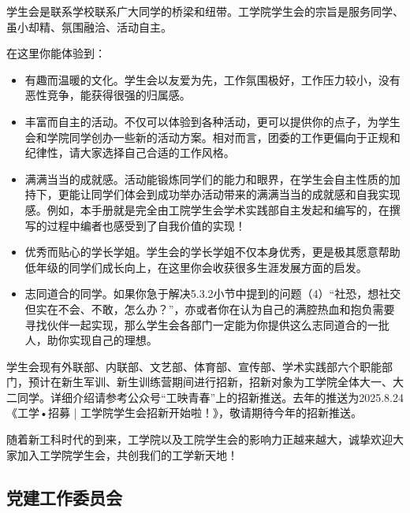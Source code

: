 学生会是联系学校联系广大同学的桥梁和纽带。工学院学生会的宗旨是服务同学、虽小却精、氛围融洽、活动自主。

\vspace{10pt}

在这里你能体验到：

\begin{itemize}
    \item 有趣而温暖的文化。学生会以友爱为先，工作氛围极好，工作压力较小，没有恶性竞争，能获得很强的归属感。
    
    \item 丰富而自主的活动。不仅可以体验到各种活动，更可以提供你的点子，为学生会和学院同学创办一些新的活动方案。相对而言，团委的工作更偏向于正规和纪律性，请大家选择自己合适的工作风格。
    
    \item 满满当当的成就感。活动能锻炼同学们的能力和眼界，在学生会自主性质的加持下，更能让同学们体会到成功举办活动带来的满满当当的成就感和自我实现感。例如，本手册就是完全由工院学生会学术实践部自主发起和编写的，在撰写的过程中编者也感受到了自我价值的实现！
    
    \item 优秀而贴心的学长学姐。学生会的学长学姐不仅本身优秀，更是极其愿意帮助低年级的同学们成长向上，在这里你会收获很多生涯发展方面的启发。
    
    \item 志同道合的同学。如果你急于解决5.3.2小节中提到的问题（4）“社恐，想社交但实在不会、不敢，怎么办？”，亦或者你在认为自己的满腔热血和抱负需要寻找伙伴一起实现，那么学生会各部门一定能为你提供这么志同道合的一批人，助你实现自己的理想。
\end{itemize}

\vspace{10pt}

学生会现有外联部、内联部、文艺部、体育部、宣传部、学术实践部六个职能部门，预计在新生军训、新生训练营期间进行招新，招新对象为工学院全体大一、大二同学。详细介绍请参考公众号“工映青春”上的招新推送。去年的推送为2025.8.24《工学•招募 | 工学院学生会招新开始啦！》，敬请期待今年的招新推送。

\vspace{10pt}

随着新工科时代的到来，工学院以及工院学生会的影响力正越来越大，诚挚欢迎大家加入工学院学生会，共创我们的工学新天地！

\vspace{10pt}


\subsection{党建工作委员会}

